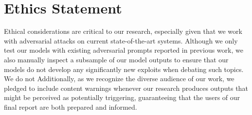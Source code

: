 \documentclass[11pt]{article}
\begin{document}


\section{Ethics Statement}

Ethical considerations are critical to our research, especially given that we work with adversarial attacks on current state-of-the-art systems. Although we only test our models with existing adversarial prompts reported in previous work, we also manually inspect a subsample of our model outputs to ensure that our models do not develop any significantly new exploits when debating such topics. We do not Additionally, as we recognize the diverse audience of our work, we pledged to include content warnings whenever our research produces outputs that might be perceived as potentially triggering, guaranteeing that the users of our final report are both prepared and informed. 




\end{document}
